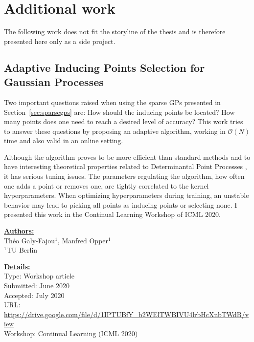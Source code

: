 \chapter{Additional work} 
\label{appendix:worshoppapers}
The following work does not fit the storyline of the thesis and is therefore presented here only as a side project.

\section{Adaptive Inducing Points Selection for Gaussian Processes}

Two important questions raised when using the sparse \ac{GPs} presented in Section~\ref{sec:sparsegps} are:
How should the inducing points be located?
How many points does one need to reach a desired level of accuracy?
This work tries to answer these questions by proposing an adaptive algorithm, working in $\mathcal{O}(N)$ time and also valid in an online setting.

Although the algorithm proves to be more efficient than standard methods and to have interesting theoretical properties related to Determinantal Point Processes \cite{Kulesza2012}, it has serious tuning issues.
The parameters regulating the algorithm, how often one adds a point or removes one, are tightly correlated to the kernel hyperparameters.
When optimizing hyperparameters during training, an unstable behavior may lead to picking all points as inducing points or selecting none.
I presented this work in the Continual Learning Workshop of ICML 2020.

\textbf{\underline{Authors:}}\\
Th\'eo Galy-Fajou$^1$, Manfred Opper$^1$\\
\small{$^1$TU Berlin}

\textbf{\underline{Details:}}\\
Type: Workshop article\\
Submitted: June 2020\\
Accepted: July 2020\\
URL: \url{https://drive.google.com/file/d/1IPTUBfY_b2WElTWBIVU4lrbHcXnbTWdB/view}\\
Workshop: Continual Learning (ICML 2020)\\





